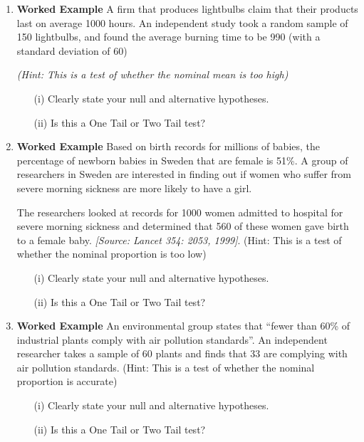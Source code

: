 \documentclass[]{report}
\begin{document}
\begin{enumerate}	
	\item \textbf{Worked Example}
	A firm that produces lightbulbs claim that their products last on average 1000 hours. An independent study took a random sample of 150 lightbulbs, and found the average burning time to be 990 (with a standard deviation of 60)
	
	\textit{(Hint: This is a test of whether the nominal mean is too high)}
	
	\begin{itemize}
		\item[(i)] Clearly state your null and alternative hypotheses.
		\item[(ii)] Is this a One Tail or Two Tail test?
	\end{itemize}
	\item \textbf{Worked Example}
	Based on birth records for millions of babies, the percentage of newborn babies in Sweden that are female is 51\%. A group of researchers in Sweden are interested in finding out if women who suffer from severe morning
	sickness are more likely to have a girl. 
	
	The researchers looked at records for 1000 women admitted to hospital for
	severe morning sickness and determined that 560 of these women gave birth
	to a female baby.  \textit{[Source: Lancet 354: 2053, 1999]}.
	(Hint: This is a test of whether the nominal proportion is too low)
	\begin{itemize}
		\item[(i)] Clearly state your null and alternative hypotheses.
		\item[(ii)] Is this a One Tail or Two Tail test?
	\end{itemize}
	\item \textbf{Worked Example}
	An environmental group states that “fewer than 60\% of industrial plants comply with air pollution standards”. An independent researcher takes a sample of 60 plants and finds that 33 are complying with air pollution standards. 
	(Hint: This is a test of whether the nominal proportion is accurate)
	\begin{itemize}
		\item[(i)] Clearly state your null and alternative hypotheses.
		\item[(ii)] Is this a One Tail or Two Tail test?
	\end{itemize}
	

\end{enumerate}
\end{document}
